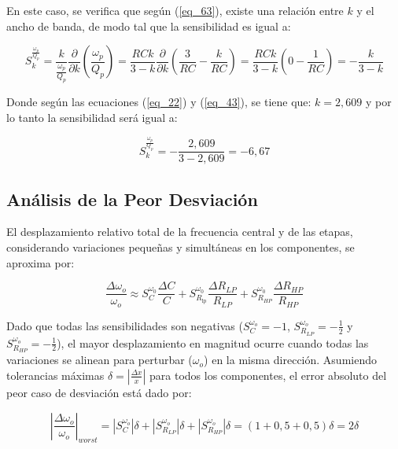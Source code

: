 \documentclass[12pt,a4paper]{article}
\begin{document}
En este caso, se verifica que según (\ref{eq_63}), existe una relación entre $k$ y el ancho de banda, de modo tal que la sensibilidad es igual a:

\begin{equation}
    \label{eq_68}
    S_{k}^{\frac{\omega_{p}}{Q_{p}}} = \frac{k}{\frac{\omega_{p}}{Q_{p}}} \frac{\partial}{\partial k} \left(\frac{\omega_{p}}{Q_{p}}\right) = \frac{RCk}{3 - k} \frac{\partial}{\partial k} \left(\frac{3}{RC} -\frac{k}{RC}\right) = \frac{RCk}{3 - k} \left(0 - \frac{1}{RC}\right) = -\frac{k}{3 - k}
\end{equation}

Donde según las ecuaciones (\ref{eq_22}) y (\ref{eq_43}), se tiene que: $k = 2,609$ y por lo tanto la sensibilidad será igual a:

\begin{equation}
    \label{eq_69}
    S_{k}^{\frac{\omega_{p}}{Q_{p}}} = -\frac{2,609}{3 - 2,609} = -6,67
\end{equation}


\subsection{Análisis de la Peor Desviación}
El desplazamiento relativo total de la frecuencia central y de las etapas, considerando variaciones pequeñas y simultáneas en los componentes, se aproxima por:

\begin{equation}
    \label{70}
    \frac{\Delta \omega_{o}}{\omega_{o}} \approx S^{\omega_0}_{C} \frac{\Delta C}{C} + S^{\omega_0}_{R_{\text{lp}}} \frac{\Delta R_{LP}}{R_{LP}} + S^{\omega_0}_{R_{HP}} \frac{\Delta R_{HP}}{R_{HP}}
\end{equation}

Dado que todas las sensibilidades son negativas ($S_{C}^{\omega_o} = - 1$, $S_{R_{LP}}^{\omega_o} = -\frac{1}{2}$ y $S_{R_{HP}}^{\omega_o} = -\frac{1}{2}$), el mayor desplazamiento en magnitud ocurre cuando todas las variaciones se alinean para perturbar ($\omega_o$) en la misma dirección. Asumiendo tolerancias máximas $\delta = |\frac{\Delta x}{x}|$ para todos los componentes, el error absoluto del peor caso de desviación está dado por:

\begin{equation}
    \label{71}
    \left|\frac{\Delta \omega_o}{\omega_o} \right|_{worst} = \left| S_{C}^{\omega_o}\right| \delta + \left| S_{R_{LP}}^{\omega_o}\right| \delta + \left| S_{R_{HP}}^{\omega_o}\right| \delta = (1 + 0,5 + 0,5)\delta = 2\delta
\end{equation}
\end{document}
